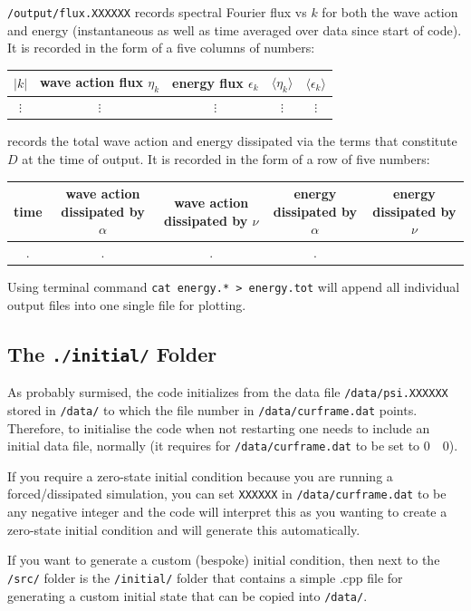 \documentclass[%
 reprint,
superscriptaddress,
aps,
pra,
onecolumn, 
]{revtex4-1}
\begin{document}
\texttt{/output/flux.XXXXXX} records spectral Fourier flux vs $k$ for both the wave action and energy (instantaneous as well as time averaged over data since start of code). It is recorded in the form of a five columns of numbers:
\begin{center}
\begin{tabular}{c|c|c|c| c}
$|k|$ & wave action flux $\eta_k$ & energy flux $\epsilon_k$ & $\langle \eta_k \rangle $ & $\langle \epsilon_k\rangle$\\
\hline
$\vdots$ & $\vdots$ & $\vdots$ & $\vdots$ & $\vdots$
\end{tabular}
\end{center}


 records the total wave action and energy dissipated via the terms that constitute $D$ at the time of output. It is recorded in the form of a row of five  numbers:
\begin{center}
\begin{tabular}{c|c|c|c|c}
time  & wave action dissipated by $\alpha$& wave action dissipated by $\nu$ & energy dissipated by $\alpha$  & energy dissipated by $\nu$\\
\hline
. & .& .& .& 
\end{tabular}
\end{center}



Using terminal command \texttt{cat energy.* > energy.tot} will append all individual output files into one single file for plotting.


\subsection{The \texttt{./initial/} Folder}

As probably surmised, the code initializes from the data file \texttt{/data/psi.XXXXXX} stored in \texttt{/data/} to which the file number in \texttt{/data/curframe.dat} points. Therefore, to initialise the code when not restarting one needs to include an initial data file, normally  (it requires for \texttt{/data/curframe.dat} to be set to $0\quad 0$). 

If you require a zero-state initial condition because you are running a forced/dissipated simulation, you can set \texttt{XXXXXX} in \texttt{/data/curframe.dat} to be any negative integer and the code will interpret this as you wanting to create a zero-state initial condition and will generate this automatically.

If you want to generate a custom (bespoke) initial condition, then next to the \texttt{/src/} folder is the \texttt{/initial/} folder that contains a simple .cpp file for generating a custom initial state that can be copied into \texttt{/data/}.











\end{document}
